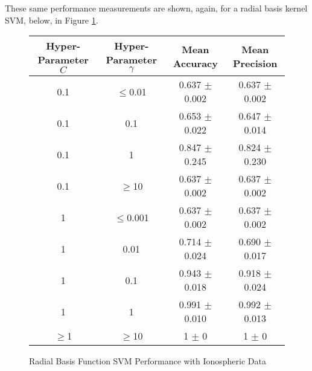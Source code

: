 \documentclass[tikz]{article}
\begin{document}
These same performance measurements are shown, again, for a radial basis kernel SVM, below, in Figure \ref{fig:ion_rbf_1}.
\begin{figure}[H]
\centering
\begin{tabular}{|c|c|c|c|}
\hline
Hyper-Parameter $C$ & Hyper-Parameter $\gamma$ & Mean Accuracy & Mean Precision \\
\hline
0.1 & $\leq$0.01 & 0.637 $\pm$ 0.002 & 0.637 $\pm$ 0.002 \\
\hline
0.1 & 0.1 & 0.653 $\pm$ 0.022 & 0.647 $\pm$ 0.014 \\
\hline
0.1 & 1 & 0.847 $\pm$ 0.245 & 0.824 $\pm$ 0.230 \\
\hline
0.1 & $\geq$10 & 0.637 $\pm$ 0.002 & 0.637 $\pm$ 0.002 \\
\hline
1 & $\leq$0.001 & 0.637 $\pm$ 0.002 & 0.637 $\pm$ 0.002 \\
\hline
1 & 0.01 & 0.714 $\pm$ 0.024 & 0.690 $\pm$ 0.017 \\
\hline
1 & 0.1 & 0.943 $\pm$ 0.018 & 0.918 $\pm$ 0.024 \\
\hline
1 & 1 & 0.991 $\pm$ 0.010 & 0.992 $\pm$ 0.013 \\
\hline
$\geq$1 & $\geq$10 & 1 $\pm$ 0 & 1 $\pm$ 0  \\
\hline
\end{tabular}
\caption{Radial Basis Function SVM Performance with Ionospheric Data}
\label{fig:ion_rbf_1}
\end{figure}
\end{document}

